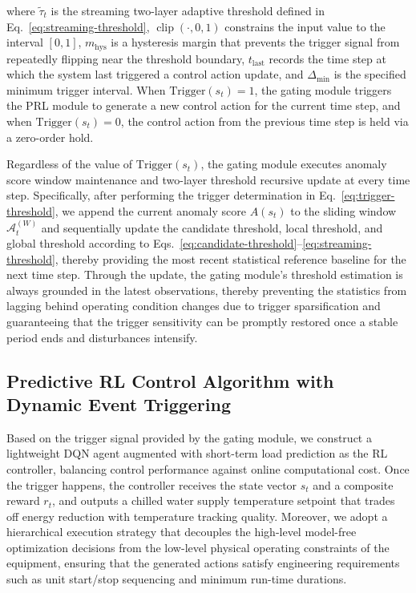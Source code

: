\documentclass[preprint,12pt]{elsarticle}
\begin{document}
\noindent where \(\tilde{\tau}_t\) is the streaming two-layer adaptive threshold defined in Eq.~\eqref{eq:streaming-threshold}, \(\operatorname{clip}(\cdot, 0, 1)\) constrains the input value to the interval \([0,1]\), \(m_{\mathrm{hys}}\) is a hysteresis margin that prevents the trigger signal from repeatedly flipping near the threshold boundary, \(t_{\mathrm{last}}\) records the time step at which the system last triggered a control action update, and \(\Delta_{\min}\) is the specified minimum trigger interval. When \(\mathrm{Trigger}(s_t)=1\), the gating module triggers the PRL module to generate a new control action for the current time step, and when \(\mathrm{Trigger}(s_t)=0\), the control action from the previous time step is held via a zero-order hold.

Regardless of the value of \(\mathrm{Trigger}(s_t)\), the gating module executes anomaly score window maintenance and two-layer threshold recursive update at every time step. Specifically, after performing the trigger determination in Eq.~\eqref{eq:trigger-threshold}, we append the current anomaly score \(A(s_t)\) to the sliding window \(\mathcal{A}_t^{(W)}\) and sequentially update the candidate threshold, local threshold, and global threshold according to Eqs.~\eqref{eq:candidate-threshold}--\eqref{eq:streaming-threshold}, thereby providing the most recent statistical reference baseline for the next time step. Through the update, the gating module's threshold estimation is always grounded in the latest observations, thereby preventing the statistics from lagging behind operating condition changes due to trigger sparsification and guaranteeing that the trigger sensitivity can be promptly restored once a stable period ends and disturbances intensify.

\subsection{Predictive RL Control Algorithm with Dynamic Event Triggering}\label{predictive-rl-control-algorithm-with-dynamic-event-triggering}

Based on the trigger signal provided by the gating module, we construct a lightweight DQN agent augmented with short-term load prediction as the RL controller, balancing control performance against online computational cost. Once the trigger happens, the controller receives the state vector \(s_t\) and a composite reward \(r_t\), and outputs a chilled water supply temperature setpoint that trades off energy reduction with temperature tracking quality. Moreover, we adopt a hierarchical execution strategy that decouples the high-level model-free optimization decisions from the low-level physical operating constraints of the equipment, ensuring that the generated actions satisfy engineering requirements such as unit start/stop sequencing and minimum run-time durations.
\end{document}
